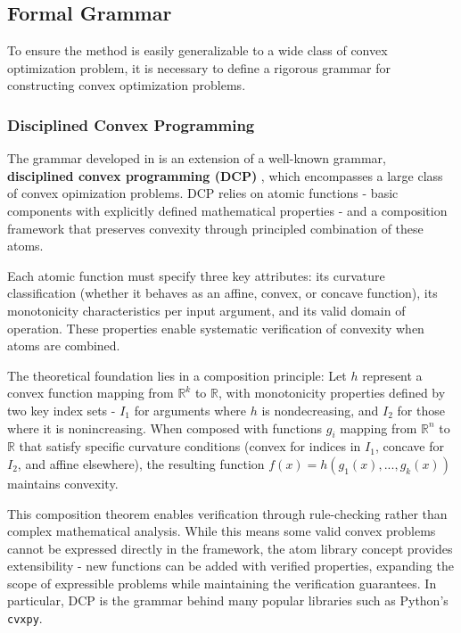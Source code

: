 \documentclass{article}
\begin{document}
\subsection{Formal Grammar}
To ensure the method is easily generalizable to a wide class of convex optimization problem, it is necessary to define a rigorous grammar for constructing convex optimization problems. 

\subsubsection{Disciplined Convex Programming}
The grammar developed in \citet{differentiabilitysolutionconvexoptimization} is an extension of a well-known grammar, \textbf{disciplined convex programming (DCP)} \citet{dcp}, which encompasses a large class of convex opimization problems. DCP relies on atomic functions - basic components with explicitly defined mathematical properties - and a composition framework that preserves convexity through principled combination of these atoms.

Each atomic function must specify three key attributes: its curvature classification (whether it behaves as an affine, convex, or concave function), its monotonicity characteristics per input argument, and its valid domain of operation. These properties enable systematic verification of convexity when atoms are combined.

The theoretical foundation lies in a composition principle: Let $h$ represent a convex function mapping from $\mathbb{R}^k$ to $\mathbb{R}$, with monotonicity properties defined by two key index sets - $I_1$ for arguments where $h$ is nondecreasing, and $I_2$ for those where it is nonincreasing. When composed with functions $g_i$ mapping from $\mathbb{R}^n$ to $\mathbb{R}$ that satisfy specific curvature conditions (convex for indices in $I_1$, concave for $I_2$, and affine elsewhere), the resulting function $f(x) = h(g_1(x),...,g_k(x))$ maintains convexity.

This composition theorem enables verification through rule-checking rather than complex mathematical analysis. While this means some valid convex problems cannot be expressed directly in the framework, the atom library concept provides extensibility - new functions can be added with verified properties, expanding the scope of expressible problems while maintaining the verification guarantees. In particular, DCP is the grammar behind many popular libraries such as Python's \texttt{cvxpy}.
\end{document}

